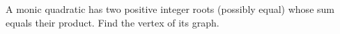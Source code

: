 A monic quadratic has two positive integer roots (possibly equal) whose sum equals their product. Find the vertex of its graph.
